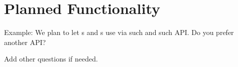 \section{Planned Functionality}

\dd

\begin{question}
Example:
We plan to let \eu s and \cg s use \cry{}
via such and such API.
Do you prefer another API?
\end{question}

\begin{question}
Add other questions if needed.
\end{question}
